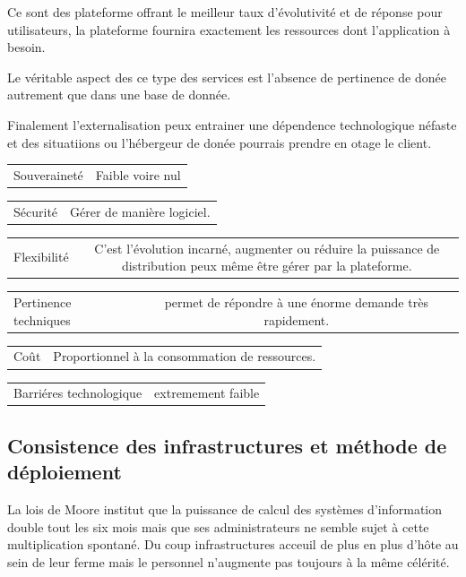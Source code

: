 \documentclass[11pt, a4paper ]{article}
\begin{document}
\begin{spacing}{1.5}
Ce sont des plateforme offrant le meilleur taux d'évolutivité et de réponse pour utilisateurs, la plateforme fournira exactement les ressources dont l'application à besoin.

Le véritable aspect des ce type des services est l'absence de pertinence de donée autrement que dans une base de donnée.

Finalement l'externalisation peux entrainer une dépendence technologique néfaste et des situatiions ou l'hébergeur de donée pourrais prendre en otage le client.

\begin{center}
	\begin{tabular}{| l | c | }
		Souveraineté & Faible voire nul\\
	\end{tabular}
	\begin{tabular}{| l | c | }
		Sécurité & Gérer de manière logiciel.\\
	\end{tabular}
	\begin{tabular}{| l | c | }
		Flexibilité & C'est l'évolution incarné, augmenter ou réduire la puissance de distribution peux même être gérer par la plateforme.\\
	\end{tabular}
	\begin{tabular}{| l | c | }
		Pertinence techniques & permet de répondre à une énorme demande très rapidement.\\
	\end{tabular}
	\begin{tabular}{| l | c | }
		Coût & Proportionnel à la consommation de ressources.\\
	\end{tabular}
	\begin{tabular}{| l | c | }
		Barriéres technologique &  extremement faible\\
	\end{tabular}
\end{center}


			\subsection{Consistence des infrastructures et méthode de déploiement}

La lois de Moore institut que la puissance de calcul des systèmes d'information double tout les six mois mais que ses administrateurs ne semble sujet à cette multiplication spontané. Du coup infrastructures acceuil de plus en plus d'hôte au sein de leur ferme mais le personnel n'augmente pas toujours à la même célérité. 


\end{spacing}
\end{document}
